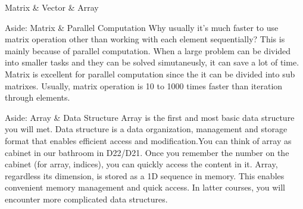 \begin{frame}{Matrix \& Vector \& Array}
\begin{block}{Aside: Matrix \& Parallel Computation\footnotemark}
Why usually it's much faster to use matrix operation other than working with each element sequentially? This is mainly because of parallel computation. When a large problem can be divided into smaller tasks and they can be solved simutaneusly, it can save a lot of time. Matrix is excellent for parallel computation since the it can be divided into sub matrixes. Usually, matrix operation is 10 to 1000 times faster than iteration through elements.
\end{block}
\end{frame}

\begin{frame}
\begin{block}{Aside: Array \& Data Structure}
Array is the first and most basic data structure you will met. Data structure is a data organization, management and storage format that enables efficient access and modification.\footnotemark You can think of array as cabinet in our bathroom in D22/D21. Once you remember the number on the cabinet (for array, indices), you can quickly access the content in it. Array, regardless its dimension, is stored as a 1D sequence in memory. This enables convenient memory management and quick access. In latter courses, you will encounter more complicated data structures. 
\end{block}
\end{frame}



